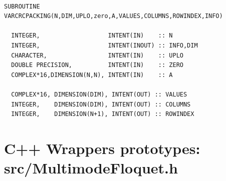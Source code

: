 \documentclass[10pt,a4paper]{article}
\begin{document}
\begin{verbatim}

SUBROUTINE VARCRCPACKING(N,DIM,UPLO,zero,A,VALUES,COLUMNS,ROWINDEX,INFO)

  INTEGER,                   INTENT(IN)    :: N
  INTEGER,                   INTENT(INOUT) :: INFO,DIM
  CHARACTER,                 INTENT(IN)    :: UPLO
  DOUBLE PRECISION,          INTENT(IN)    :: ZERO
  COMPLEX*16,DIMENSION(N,N), INTENT(IN)    :: A

  COMPLEX*16, DIMENSION(DIM), INTENT(OUT) :: VALUES
  INTEGER,    DIMENSION(DIM), INTENT(OUT) :: COLUMNS
  INTEGER,    DIMENSION(N+1), INTENT(OUT) :: ROWINDEX

\end{verbatim}
\newpage
\section{C++ Wrappers prototypes: src/MultimodeFloquet.h}
\end{document}
